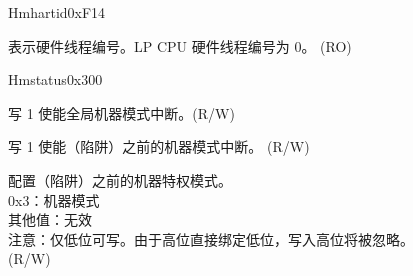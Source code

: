 \begin{register}{H}{mhartid}{0xF14}\label{regdesc:LPMHARTID}
%
\regnewline%
\begin{regdesc}\begin{reglist}
\label{fielddesc:LPMHARTID}\item [MHARTID] 表示硬件线程编号。LP CPU 硬件线程编号为 0。 (RO)
\end{reglist}\end{regdesc}
\end{register}

\begin{register}{H}{mstatus}{0x300}\label{regdesc:LPMSTATUS}
%
%
%
%
%
%
%
%
%
\regnewline%
\begin{regdesc}\begin{reglist}
\label{fielddesc:LPMSTATUSMIE}\item [MIE] 写 1 使能全局机器模式中断。(R/W)
\label{fielddesc:LPMSTATUSMPIE}\item [MPIE] 写 1 使能（陷阱）之前的机器模式中断。 (R/W)
\label{fielddesc:LPMSTATUSMPP}\item [MPP] 配置（陷阱）之前的机器特权模式。\\
0x3：机器模式\\
其他值：无效\\
注意：仅低位可写。由于高位直接绑定低位，写入高位将被忽略。\\
(R/W)
\end{reglist}\end{regdesc}
\end{register}

